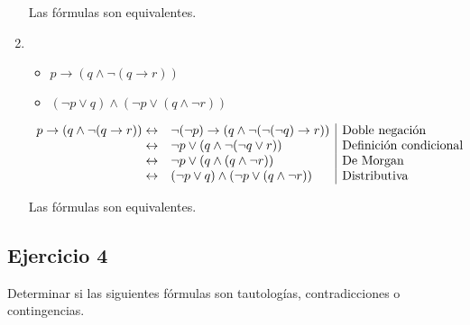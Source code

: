 \begin{enumerate}[label=\alph*)]
          Las fórmulas son equivalentes.
    \item
          \begin{itemize}
              \item $p \to (q \land \neg (q \to r))$
              \item $(\neg p \lor q) \land (\neg p \lor (q \land \neg r))$
          \end{itemize}

          \[
              \begin{array}{rl|l}
                  p \to (q \land \neg (q \to r)) \leftrightarrow & \neg (\neg p) \to (q \land \neg (\neg (\neg q) \to r)) & \text{Doble negación}         \\
                  \leftrightarrow                                & \neg p \lor (q \land \neg (\neg q \lor r))             & \text{Definición condicional} \\
                  \leftrightarrow                                & \neg p \lor (q \land (q \land \neg r))                 & \text{De Morgan}              \\
                  \leftrightarrow                                & (\neg p \lor q) \land (\neg p \lor (q \land \neg r))   & \text{Distributiva}
              \end{array}
          \]

          Las fórmulas son equivalentes.
\end{enumerate}

\subsection{Ejercicio 4}
Determinar si las siguientes fórmulas son tautologías, contradicciones o contingencias.

